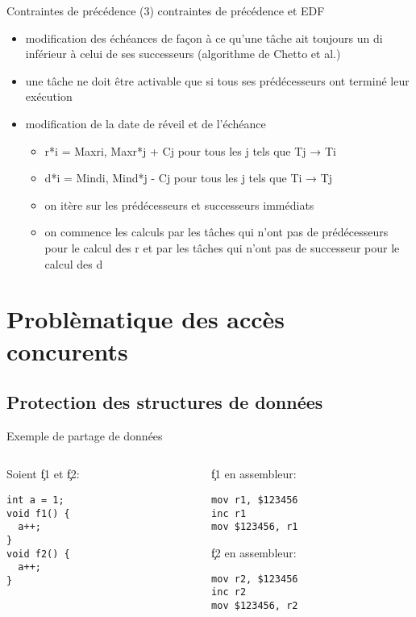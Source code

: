 \begin{frame}{Contraintes de précédence (3)} 
  contraintes de précédence et EDF
  \begin{itemize}
  \item modification des échéances de façon à ce qu'une tâche ait toujours un di inférieur à celui de ses successeurs (algorithme de Chetto et al.)
  \item une tâche ne doit être activable que si tous ses prédécesseurs ont terminé leur exécution 
  \item modification de la date de réveil et de l'échéance
    \begin{itemize}
    \item  r*i = Max{ri, Max{r*j + Cj}} pour tous les j tels que Tj → Ti
    \item d*i = Min{di, Min{d*j - Cj}} pour tous les j tels que Ti → Tj
    \item on itère sur les prédécesseurs et successeurs immédiats
    \item on commence les calculs par les tâches qui n'ont pas de prédécesseurs pour le calcul des r et par les tâches qui n'ont pas de successeur pour le calcul des d
    \end{itemize}
  \end{itemize}
\end{frame}

\section{Problèmatique des accès concurents}

\subsection{Protection des structures de données}

\begin{frame}[fragile]{Exemple de partage de données}
  \begin{columns}
    \begin{column}{5cm}
      Soient \c{f1} et \c{f2}:
      \begin{lstlisting}
int a = 1;
void f1() {
  a++;
}
void f2() {
  a++;
}
       \end{lstlisting}
     \end{column}
     \begin{column}{5cm}
       \c{f1} en assembleur:
       \begin{lstlisting}
mov r1, $123456
inc r1
mov $123456, r1
       \end{lstlisting}
       \c{f2} en assembleur:
       \begin{lstlisting} 
mov r2, $123456
inc r2
mov $123456, r2
      \end{lstlisting}
    \end{column}
  \end{columns}
\end{frame} 

